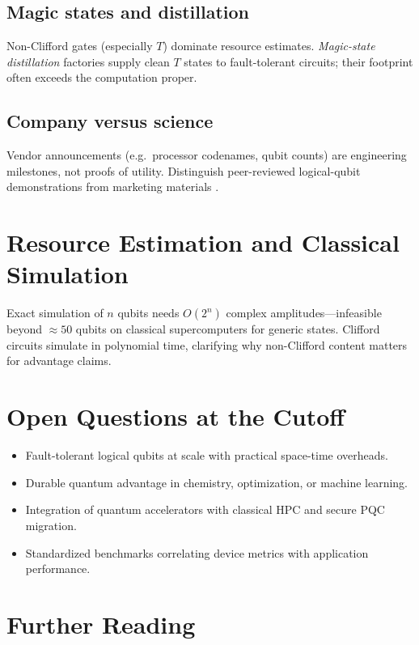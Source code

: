 \subsection{Magic states and distillation}

Non-Clifford gates (especially $T$) dominate resource estimates. \emph{Magic-state distillation} factories supply clean $T$ states to fault-tolerant circuits; their footprint often exceeds the computation proper.

\subsection{Company versus science}

Vendor announcements (e.g.\ processor codenames, qubit counts) are engineering milestones, not proofs of utility. Distinguish peer-reviewed logical-qubit demonstrations \cite{acharya2024} from marketing materials \cite{google2024}.

\section{Resource Estimation and Classical Simulation}
\label{sec:resources}

Exact simulation of $n$ qubits needs $O(2^n)$ complex amplitudes---infeasible beyond $\approx 50$ qubits on classical supercomputers for generic states. Clifford circuits simulate in polynomial time, clarifying why non-Clifford content matters for advantage claims.

\section{Open Questions at the \cutoff{} Cutoff}
\label{sec:open-questions}

\begin{itemize}
\item Fault-tolerant logical qubits at scale with practical space-time overheads.
\item Durable quantum advantage in chemistry, optimization, or machine learning.
\item Integration of quantum accelerators with classical HPC and secure PQC migration.
\item Standardized benchmarks correlating device metrics with application performance.
\end{itemize}

\section*{Further Reading}

